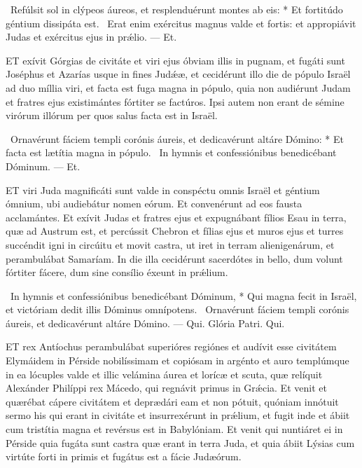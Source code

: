 \R\ Refúlsit sol in clýpeos áureos, et resplenduérunt montes ab eis: * Et fortitúdo géntium dissipáta est. \V\ Erat enim exércitus magnus valde et fortis: et appropiávit Judas et exércitus ejus in prǽlio. — Et.


\lettrine[lines=2]{E}{T} exívit Górgias de civitáte et viri ejus óbviam illis in pugnam, et fugáti sunt Joséphus et Azarías usque in fines Judǽæ, et cecidérunt illo die de pópulo Israël ad duo míllia viri, et facta est fuga magna in pópulo, quia non audiérunt Judam et fratres ejus existimántes fórtiter se factúros. Ipsi autem non erant de sémine virórum illórum per quos salus facta est in Israël.

\R\ Ornavérunt fáciem templi corónis áureis, et dedicavérunt altáre Dómino: * Et facta est lætítia magna in pópulo. \V\ In hymnis et confessiónibus benedicébant Dóminum. — Et.



\lettrine[lines=2]{E}{T} viri Juda magnificáti sunt valde in conspéctu omnis Israël et géntium ómnium, ubi audiebátur nomen eórum. Et convenérunt ad eos fausta acclamántes. Et exívit Judas et fratres ejus et expugnábant fílios Esau in terra, quæ ad Austrum est, et percússit Chebron et fílias ejus et muros ejus et turres succéndit igni in circúitu et movit castra, ut iret in terram alienigenárum, et perambulábat Samaríam. In die illa cecidérunt sacerdótes in bello, dum volunt fórtiter fácere, dum sine consílio éxeunt in prǽlium.

\R\ In hymnis et confessiónibus benedicébant Dóminum, * Qui magna fecit in Israël, et victóriam dedit illis Dóminus omnípotens. \V\ Ornavérunt fáciem templi corónis áureis, et dedicavérunt altáre Dómino. — Qui. Glória Patri. Qui.




\lettrine[lines=2]{E}{T} rex Antíochus perambulábat superióres regiónes et audívit esse civitátem Elymáidem in Pérside nobilíssimam et copiósam in argénto et auro templúmque in ea lócuples valde et illic velámina áurea et lorícæ et scuta, quæ relíquit Alexánder Philíppi rex Mácedo, qui regnávit primus in Grǽcia. Et venit et quærébat cápere civitátem et deprædári eam et non pótuit, quóniam innótuit sermo his qui erant in civitáte et insurrexérunt in prǽlium, et fugit inde et ábiit cum tristítia magna et revérsus est in Babylóniam. Et venit qui nuntiáret ei in Pérside quia fugáta sunt castra quæ erant in terra Juda, et quia ábiit Lýsias cum virtúte forti in primis et fugátus est a fácie Judæórum.

